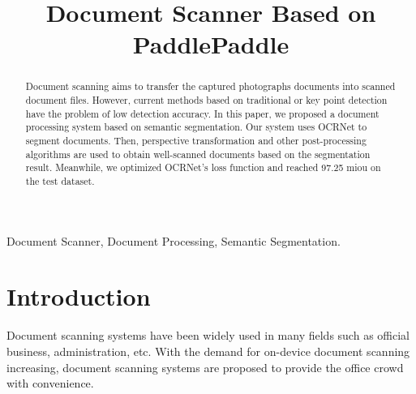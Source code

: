\documentclass[10pt, conference, compsocconf]{IEEEtran}
\begin{document}
%
\title{Document Scanner Based on PaddlePaddle}

\author{
}
\maketitle
\begin{abstract}

Document scanning aims to transfer the captured photographs documents into scanned document files. 
However, current methods based on traditional or key point detection have the problem of low detection accuracy.
In this paper, we proposed a document processing system based on semantic segmentation.
Our system uses OCRNet to segment documents.
Then, perspective transformation and other post-processing algorithms are used to obtain well-scanned documents based on the segmentation result.
Meanwhile, we optimized OCRNet's loss function and reached 97.25 miou on the test dataset.

\end{abstract}

\begin{IEEEkeywords}

Document Scanner, Document Processing, Semantic Segmentation.

\end{IEEEkeywords}

\IEEEpeerreviewmaketitle

\section{Introduction}


Document scanning systems have been widely used in many fields such as official business, administration, etc. 
With the demand for on-device document scanning increasing, document scanning systems are proposed to provide the office crowd with convenience. 
\end{document}
